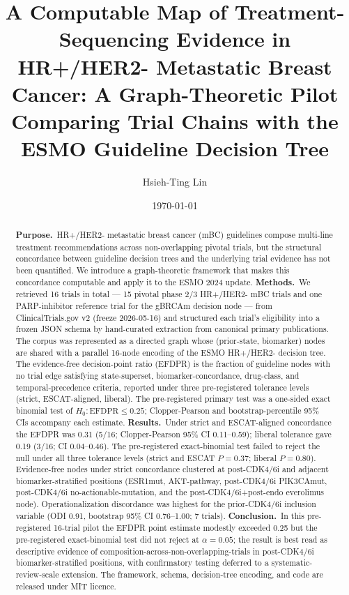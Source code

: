 \documentclass[11pt,a4paper]{article}
\title{\fontsize{15}{18}\bfseries\sffamily
A Computable Map of Treatment-Sequencing Evidence in HR+/HER2- Metastatic Breast Cancer:
A Graph-Theoretic Pilot Comparing Trial Chains with the ESMO Guideline Decision Tree}
\author[1,*]{Hsieh-Ting Lin}
\affil[1]{Department of Hematology \& Medical Oncology, Koo Foundation Sun Yat-Sen Cancer Center, 125 Lide Rd., Beitou Dist., Taipei 11259, Taiwan. ORCID iD: 0009-0002-3974-4528.}
\affil[*]{Correspondence: \texttt{htlin222@kfsyscc.org}.}
\date{\today}
\begin{document}
\maketitle
\thispagestyle{empty}
\vspace{-1.5em}

\begin{abstract}
\noindent
\textbf{Purpose.}\, HR+/HER2- metastatic breast cancer (mBC) guidelines compose multi-line treatment recommendations across non-overlapping pivotal trials, but the structural concordance between guideline decision trees and the underlying trial evidence has not been quantified. We introduce a graph-theoretic framework that makes this concordance computable and apply it to the ESMO 2024 update.
\textbf{Methods.}\, We retrieved 16 trials in total --- 15 pivotal phase 2/3 HR+/HER2- mBC trials and one PARP-inhibitor reference trial for the gBRCAm decision node --- from ClinicalTrials.gov v2 (freeze 2026-05-16) and structured each trial's eligibility into a frozen JSON schema by hand-curated extraction from canonical primary publications. The corpus was represented as a directed graph whose (prior-state, biomarker) nodes are shared with a parallel 16-node encoding of the ESMO HR+/HER2- decision tree. The evidence-free decision-point ratio (EFDPR) is the fraction of guideline nodes with no trial edge satisfying state-superset, biomarker-concordance, drug-class, and temporal-precedence criteria, reported under three pre-registered tolerance levels (strict, ESCAT-aligned, liberal). The pre-registered primary test was a one-sided exact binomial test of $H_0: \mathrm{EFDPR} \le 0.25$; Clopper-Pearson and bootstrap-percentile 95\% CIs accompany each estimate.
\textbf{Results.}\, Under strict and ESCAT-aligned concordance the EFDPR was 0.31 (5/16; Clopper-Pearson 95\% CI 0.11--0.59); liberal tolerance gave 0.19 (3/16; CI 0.04--0.46). The pre-registered exact-binomial test failed to reject the null under all three tolerance levels (strict and ESCAT $P=0.37$; liberal $P=0.80$). Evidence-free nodes under strict concordance clustered at post-CDK4/6i and adjacent biomarker-stratified positions (ESR1mut, AKT-pathway, post-CDK4/6i PIK3CAmut, post-CDK4/6i no-actionable-mutation, and the post-CDK4/6i+post-endo everolimus node). Operationalization discordance was highest for the prior-CDK4/6i inclusion variable (ODI 0.91, bootstrap 95\% CI 0.76--1.00; 7 trials).
\textbf{Conclusion.}\, In this pre-registered 16-trial pilot the EFDPR point estimate modestly exceeded 0.25 but the pre-registered exact-binomial test did not reject at $\alpha=0.05$; the result is best read as descriptive evidence of composition-across-non-overlapping-trials in post-CDK4/6i biomarker-stratified positions, with confirmatory testing deferred to a systematic-review-scale extension. The framework, schema, decision-tree encoding, and code are released under MIT licence.
\end{abstract}
\end{document}
